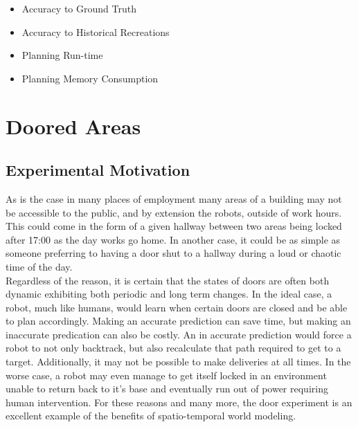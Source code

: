   \begin{itemize}

    \item Accuracy to Ground Truth

    \item Accuracy to Historical Recreations

    \item Planning Run-time

    \item Planning Memory Consumption

  \end{itemize}

  \section{ Doored Areas}

  \subsection{ Experimental Motivation }

  As is the case in many places of employment many areas of a building may not
  be accessible to the public, and by extension the robots, outside of work
  hours.  This could come in the form of a given hallway between two areas being
  locked after 17:00 as the day works go home. In another case, it could be as
  simple as someone preferring to having a door shut to a hallway during a loud
  or chaotic time of the day. \\

  Regardless of the reason, it is certain that the states of doors are often
  both dynamic exhibiting both periodic and long term changes. In the ideal case, a robot, much like humans,
  would learn when certain doors are closed and be able to plan accordingly.
  Making an accurate prediction can save time, but making an inaccurate
  predication can also be costly. An in accurate prediction would force a robot
  to not only backtrack, but also recalculate that path required to get to a
  target. Additionally, it may not be possible to make deliveries at all times.
  In the worse case, a robot may even manage to get itself locked in an
  environment unable to return back to it's base and eventually run out of power
  requiring human intervention. For these reasons and many more, the door
  experiment is an excellent example of the benefits of spatio-temporal world
  modeling. \\

